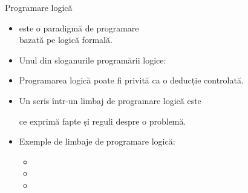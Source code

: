 \documentclass[xcolor=x11names,compress,10pt]{beamer}
\begin{document}
\begin{frame}{Programare logică}


\begin{itemize}
	\item {} este o paradigmă de programare \\
	bazată pe logică formală.
	
	\vspace{.2cm} \pause
	\item Unul din sloganurile programării logice:
	\begin{center}
	\href{https://www.doc.ic.ac.uk/~rak/papers/History.pdf}{}  	
	\end{center} 
	
	\vspace{.2cm} \pause
	\item Programarea logică poate fi privită ca o deducție controlată.	
	
	\vspace{.2cm} \pause
	\item Un  scris într-un limbaj de programare logică este
	\begin{center}
	\end{center}
	ce exprimă fapte și reguli despre o problemă.

	\vspace{.2cm} \pause
	\item Exemple de limbaje de programare logică: 
		\begin{itemize}
			\item {}
			\item {}
			\item {}
		\end{itemize}
\end{itemize}
\end{frame}

\end{document}
